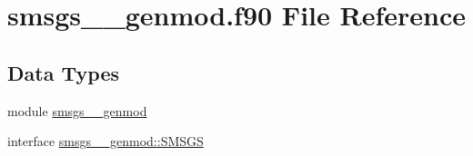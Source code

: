 \hypertarget{smsgs____genmod_8f90}{\section{smsgs\+\_\+\+\_\+genmod.\+f90 File Reference}
\label{smsgs____genmod_8f90}
}
\subsection*{Data Types}
\begin{DoxyCompactItemize}
\item 
module \hyperlink{classsmsgs____genmod}{smsgs\+\_\+\+\_\+genmod}
\item 
interface \hyperlink{interfacesmsgs____genmod_1_1SMSGS}{smsgs\+\_\+\+\_\+genmod\+::\+S\+M\+S\+G\+S}
\end{DoxyCompactItemize}
